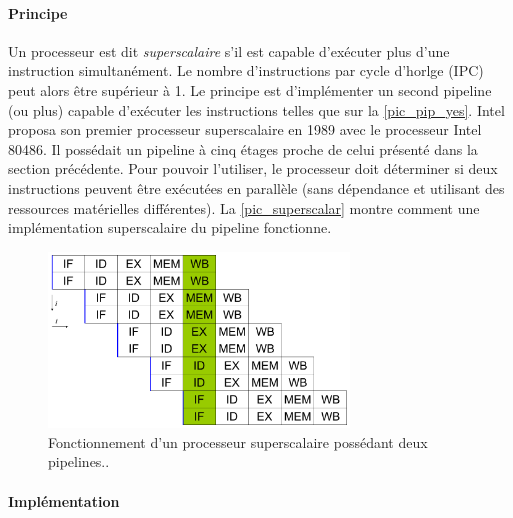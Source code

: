         \paragraph{Principe}
        
            Un processeur est dit \textit{superscalaire} s'il est capable d'exécuter plus d'une instruction simultanément. Le nombre d'instructions par cycle d'horlge (IPC) peut alors être supérieur à 1. Le principe est d'implémenter un second pipeline (ou plus) capable d'exécuter les instructions telles que sur la \autoref{pic_pip_yes}. Intel proposa son premier processeur superscalaire en 1989 avec le processeur Intel 80486. Il possédait un pipeline à cinq étages proche de celui présenté dans la section précédente. 
            Pour pouvoir l'utiliser, le processeur doit déterminer si deux instructions peuvent être exécutées en parallèle (sans dépendance et utilisant des ressources matérielles différentes). La \autoref{pic_superscalar} montre comment une implémentation superscalaire du pipeline fonctionne. 
            
            \begin{figure}
                \center
                \includegraphics[width=8cm]{images/Chapitre1/superscalar.png}
                \caption[Processeur superscalaire]{Fonctionnement d'un processeur superscalaire possédant deux pipelines.\protect\footnotemark. \label{pic_superscalar} }
            \end{figure}
        
        
        \paragraph{Implémentation}
        
